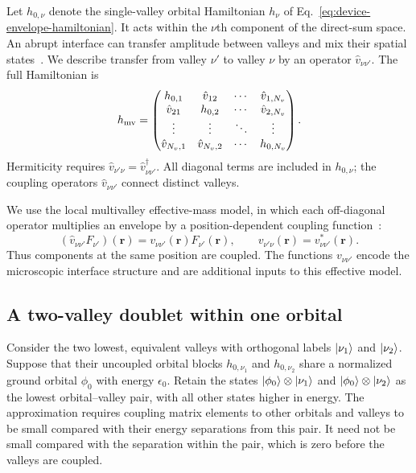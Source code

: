 Let $h_{0,\nu}$ denote the single-valley orbital Hamiltonian
$h_\nu$ of Eq.~\eqref{eq:device-envelope-hamiltonian}. It acts
within the $\nu$th component of the direct-sum space.
An abrupt interface can transfer amplitude between
valleys and mix their spatial states~\cite{Friesen2010}.
We describe transfer from valley $\nu'$ to valley $\nu$ by
an operator $\hat v_{\nu\nu'}$. The full Hamiltonian is
\begingroup
\let\valleyblocklabel\label
\begin{equation}
 h_{\mathrm{mv}}=
 \begin{pmatrix}
  h_{0,1} & \hat v_{12} & \cdots & \hat v_{1,N_v}\\
  \hat v_{21} & h_{0,2} & \cdots & \hat v_{2,N_v}\\
  \vdots & \vdots & \ddots & \vdots\\
  \hat v_{N_v,1} & \hat v_{N_v,2} & \cdots & h_{0,N_v}
 \end{pmatrix}.
 \label{eq:device-multivalley-hamiltonian}
 \begingroup\let\label\valleyblocklabel
 \label{eq:device-coupled-valley-equations}\endgroup
\end{equation}
\endgroup
Hermiticity requires
$\hat v_{\nu'\nu}=\hat v_{\nu\nu'}^\dagger$.
All diagonal terms are included in $h_{0,\nu}$; the coupling
operators $\hat v_{\nu\nu'}$ connect distinct valleys.

We use the local multivalley effective-mass model, in which each
off-diagonal operator multiplies an envelope by a position-dependent
coupling function~\cite{QTCADMultivalley}:
\[
 (\hat v_{\nu\nu'}F_{\nu'})(\mathbf r)
       =v_{\nu\nu'}(\mathbf r)F_{\nu'}(\mathbf r),
 \qquad
 v_{\nu'\nu}(\mathbf r)=v_{\nu\nu'}^*(\mathbf r).
\]
Thus components at the same position are coupled. The functions
$v_{\nu\nu'}$ encode the microscopic interface structure and are
additional inputs to this effective model.

\subsection{A two-valley doublet within one orbital}
\label{sec:device-valley-doublet-projection}

Consider the two lowest, equivalent valleys with orthogonal labels
$\lvert \nu_1\rangle$ and $\lvert \nu_2\rangle$. Suppose that their uncoupled
orbital blocks $h_{0,\nu_1}$ and $h_{0,\nu_2}$ share a normalized
ground orbital $\phi_0$ with energy $\epsilon_0$.
Retain the states $\lvert \phi_0\rangle\otimes\lvert \nu_1\rangle$ and
$\lvert \phi_0\rangle\otimes\lvert \nu_2\rangle$ as the lowest orbital--valley
pair, with all other states higher in energy. The approximation requires
coupling matrix elements to other orbitals and valleys to be small
compared with their energy separations from this pair. It need not
be small compared with the separation within the pair, which is
zero before the valleys are coupled.

